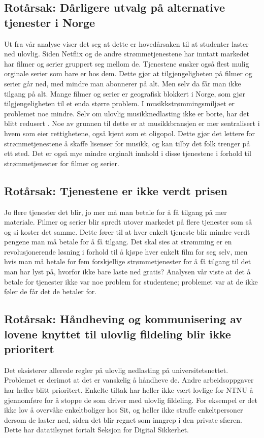 \subsection*{Rotårsak: Dårligere utvalg på alternative tjenester i Norge}
Ut fra vår analyse viser det seg at dette er hovedårsaken til at studenter laster ned ulovlig. Siden Netflix og de andre strømmetjenestene har inntatt markedet har filmer og serier gruppert seg mellom de. Tjenestene ønsker også flest mulig orginale serier som bare er hos dem. Dette gjør at tilgjengeligheten på filmer og serier går ned, med mindre man abonnerer på alt. Men selv da får man ikke tilgang på alt. Mange filmer og serier er geografisk blokkert i Norge, som gjør tilgjengeligheten til et enda større problem. I musikkstrømmingsmiljøet er problemet noe mindre. Selv om ulovlig musikknedlasting ikke er borte, har det blitt redusert \cite{musikkstream}. Noe av grunnen til dette er at musikkbransjen er mer sentralisert i hvem som eier rettighetene, også kjent som et oligopol. Dette gjør det lettere for strømmetjenestene å skaffe lisenser for musikk, og kan tilby det folk trenger på ett sted. Det er også mye mindre orginalt innhold i disse tjenestene i forhold til strømmetjenester for filmer og serier. 

\subsection*{Rotårsak: Tjenestene er ikke verdt prisen}
Jo flere tjenester det blir, jo mer må man betale for å få tilgang på mer materiale. Filmer og serier blir spredt utover markedet på flere tjenester som så og si koster det samme. Dette fører til at hver enkelt tjeneste blir mindre verdt pengene man må betale for å få tilgang. Det skal sies at strømming er en revolusjonerende løsning i forhold til å kjøpe hver enkelt film for seg selv, men hvis man må betale for fem forskjellige strømmetjenester for å få tilgang til det man har lyst på, hvorfor ikke bare laste ned gratis? Analysen vår viste at det å betale for tjenester ikke var noe problem for studentene; problemet var at de ikke føler de får det de betaler for. 

\subsection*{Rotårsak: Håndheving og kommunisering av lovene knyttet til ulovlig fildeling blir ikke prioritert}
Det eksisterer allerede regler på ulovlig nedlasting på universitetsnettet. Problemet er derimot at det er vanskelig å håndheve de. Andre arbeidsoppgaver har heller blitt prioritert. Enkelte tiltak har heller ikke vært lovlige for NTNU å gjennomføre for å stoppe de som driver med ulovlig fildeling. For eksempel er det ikke lov å overvåke enkeltboliger hos Sit, og heller ikke straffe enkeltpersoner dersom de laster ned, siden det blir regnet som inngrep i den private sfæren. Dette har datatilsynet fortalt Seksjon for Digital Sikkerhet. 


